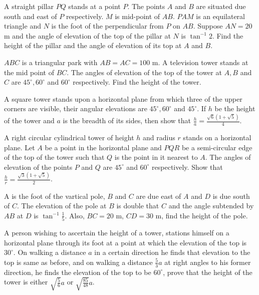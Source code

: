 \item A straight pillar $PQ$ stands at a point $P$. The points $A$ and $B$ are situated due south
  and east of $P$ respectively. $M$ is mid-point of $AB$. $PAM$ is an equilateral triangle and $N$
  is the foot of the perpendicular from $P$ on $AB$. Suppose $AN = 20$ m and the angle of elevation of the top
  of the pillar at $N$ is $\tan^{-1}2$. Find the height of the pillar and the angle of elevation of its top at
  $A$ and $B$.

\item $ABC$ is a triangular park with $AB = AC = 100$ m. A television tower stands at the mid point of $BC$. The
  angles of elevation of the top of the tower at $A, B$ and $C$ are $45^\circ, 60^\circ$ and $60^\circ$
  respectively. Find the height of the tower.

\item A square tower stands upon a horizontal plane from which three of the upper corners are visible, their angular elevations are
  $45^\circ, 60^\circ$ and $45^\circ$. If $h$ be the height of the tower and $a$ is the breadth of its
  sides, then show that $\frac{h}{a} = \frac{\sqrt{6}(1 + \sqrt{5})}{4}$.

\item A right circular cylindrical tower of height $h$ and radius $r$ stands on a horizontal plane. Let $A$ be a
  point in the horizontal plane and $PQR$ be a semi-circular edge of the top of the tower such that $Q$ is the point
  in it nearest to $A$. The angles of elevation of the points $P$ and $Q$ are $45^\circ$ and
  $60^\circ$ respectively. Show that $\frac{h}{r} = \frac{\sqrt{3}(1 + \sqrt{5})}{2}$.

\item A is the foot of the vartical pole, $B$ and $C$ are due east of $A$ and $D$ is due south of
  $C$. The elevation of the pole at $B$ is double that $C$ and the angle subtended by $AB$ at $D$
  is $\tan^{-1}\frac{1}{5}$. Also, $BC = 20$ m, $CD = 30$ m, find the height of the pole.

\item A person wishing to ascertain the height of a tower, stations himself on a horizontal plane through its foot at a point at
  which the elevation of the top is $30^\circ$. On walking a distance $a$ in a certain direction he finds that
  elevation to the top is same as before, and on walking a distance $\frac{5}{3}a$ at right angles to his former
  direction, he finds the elevation of the top to be $60^\circ$, prove that the height of the tower is either
  $\sqrt{\frac{5}{6}}a$ or $\sqrt{\frac{85}{48}}a$.

